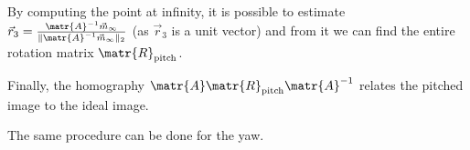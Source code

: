 \begin{descriptionlist}
\begin{example}
            By computing the point at infinity, it is possible to estimate $\vec{r}_3 = \frac{\matr{A}^{-1} \vec{m}_\infty}{\Vert \matr{A}^{-1} \vec{m}_\infty \Vert_2}$
            (as $\vec{r}_3$ is a unit vector) and from it we can find the entire rotation matrix $\matr{R}_\text{pitch}$.

            Finally, the homography $\matr{A}\matr{R}_\text{pitch}\matr{A}^{-1}$ relates the pitched image to the ideal image.

            \indenttbox
            \begin{remark}
                The same procedure can be done for the yaw.
            \end{remark}
        \end{example}
\end{descriptionlist}